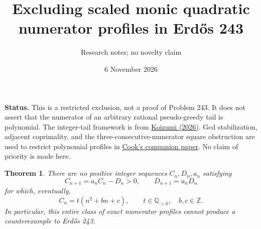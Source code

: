 \documentclass[11pt]{article}
\title{Excluding scaled monic quadratic numerator profiles in Erd\H{o}s 243}
\author{Research notes; no novelty claim}
\date{6 November 2026}
\newtheorem{theorem}{Theorem}
\begin{document}
\maketitle

\noindent\textbf{Status.} This is a restricted exclusion, not a proof of
Problem 243. It does not assert that the numerator of an arbitrary rational
pseudo-greedy tail is polynomial. The integer-tail framework is from
\href{https://math.colgate.edu/~integers/aa28/aa28.pdf}{Koizumi (2026)}.
Gcd stabilization, adjacent coprimality, and the
three-consecutive-numerator square obstruction are used to restrict
polynomial profiles in
\href{https://github.com/wcook04/plectis-erdos/blob/main/paper/243/erdos243-reciprocal-tail-reasoning-surface.tex}{Cook's companion paper}.
No claim of priority is made here.

\begin{theorem}
There are no positive integer sequences $C_n,D_n,a_n$ satisfying
\[
 C_{n+1}=a_n C_n-D_n>0,\qquad D_{n+1}=a_nD_n
\]
for which, eventually,
\[
 C_n=t(n^2+bn+c),\qquad t\in\mathbb Q_{>0},\quad b,c\in\mathbb Z.
\]
In particular, this entire class of exact numerator profiles cannot
produce a counterexample to Erd\H{o}s 243.
\end{theorem}
\end{document}
